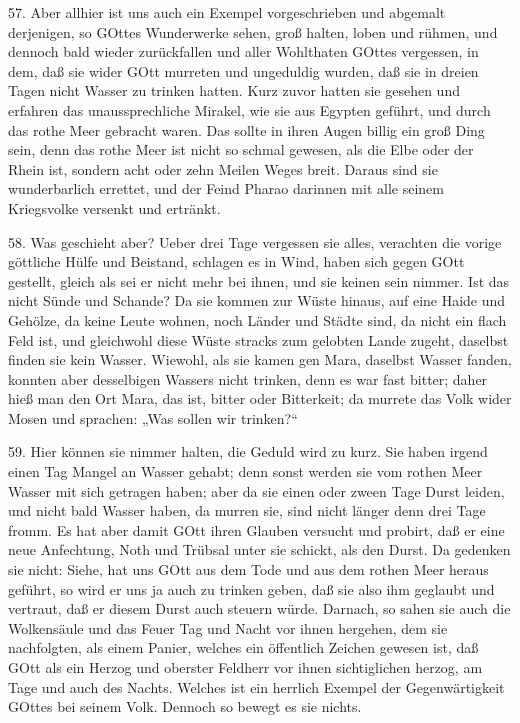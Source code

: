 57. Aber allhier ist uns auch ein Exempel vorgeschrieben und abgemalt derjenigen, so GOttes Wunderwerke sehen, groß halten, loben und rühmen, und dennoch bald wieder zurückfallen und aller Wohlthaten GOttes vergessen, in dem, daß sie wider GOtt murreten und ungeduldig wurden, daß sie in dreien Tagen nicht Wasser zu trinken hatten. Kurz zuvor hatten sie gesehen und erfahren das unaussprechliche Mirakel, wie sie aus Egypten geführt, und durch das rothe Meer gebracht waren. Das sollte in ihren Augen billig ein groß Ding sein, denn das rothe Meer ist nicht so schmal gewesen, als die Elbe oder der Rhein ist, sondern acht oder zehn Meilen Weges breit. Daraus sind sie wunderbarlich errettet, und der Feind Pharao darinnen mit alle seinem Kriegsvolke versenkt und ertränkt.

58. Was geschieht aber? Ueber drei Tage vergessen sie alles, verachten die vorige göttliche Hülfe und Beistand, schlagen es in Wind, haben sich gegen GOtt gestellt, gleich als sei er nicht mehr bei ihnen, und sie keinen sein nimmer. Ist das nicht Sünde und Schande? Da sie kommen zur Wüste hinaus, auf eine Haide und Gehölze, da keine Leute wohnen, noch Länder und Städte sind, da nicht ein flach Feld ist, und gleichwohl diese Wüste stracks zum gelobten Lande zugeht, daselbst finden sie kein Wasser. Wiewohl, als sie kamen gen Mara, daselbst Wasser fanden, konnten aber desselbigen Wassers nicht trinken, denn es war fast bitter; daher hieß man den Ort Mara, das ist, bitter oder Bitterkeit; da murrete das Volk wider Mosen und sprachen: „Was sollen wir trinken?“

59. Hier können sie nimmer halten, die Geduld wird zu kurz. Sie haben irgend einen Tag Mangel an Wasser gehabt; denn sonst werden sie vom rothen Meer Wasser mit sich getragen haben; aber da sie einen oder zween Tage Durst leiden, und nicht bald Wasser haben, da murren sie, sind nicht länger denn drei Tage fromm. Es hat aber damit GOtt ihren Glauben versucht und probirt, daß er eine neue Anfechtung, Noth und Trübsal unter sie schickt, als den Durst. Da gedenken sie nicht: Siehe, hat uns GOtt aus dem Tode und aus dem rothen Meer heraus geführt, so wird er uns ja auch zu trinken geben, daß sie also ihm geglaubt und vertraut, daß er diesem Durst auch steuern würde. Darnach, so sahen sie auch die Wolkensäule und das Feuer Tag und Nacht vor ihnen hergehen, dem sie nachfolgten, als einem Panier, welches ein öffentlich Zeichen gewesen ist, daß GOtt als ein Herzog und oberster Feldherr vor ihnen sichtiglichen herzog, am Tage und auch des Nachts. Welches ist ein herrlich Exempel der Gegenwärtigkeit GOttes bei seinem Volk. Dennoch so bewegt es sie nichts.

